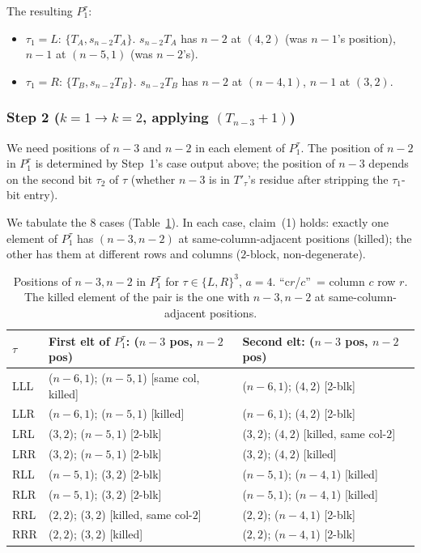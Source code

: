 \documentclass[11pt]{article}
\theoremstyle{definition}
\begin{document}
The resulting $P_1^\tau$:
\begin{itemize}[leftmargin=2em,topsep=0.3em,itemsep=0.2em]
\item $\tau_1=L$: $\{T_A,s_{n-2}T_A\}$.  $s_{n-2}T_A$ has $n-2$ at
$(4,2)$ (was $n-1$'s position), $n-1$ at $(n-5,1)$ (was $n-2$'s).
\item $\tau_1=R$: $\{T_B,s_{n-2}T_B\}$.  $s_{n-2}T_B$ has $n-2$ at
$(n-4,1)$, $n-1$ at $(3,2)$.
\end{itemize}

\subsubsection*{Step 2 ($k=1\to k=2$, applying $(T_{n-3}{+}1)$)}

We need positions of $n-3$ and $n-2$ in each element of $P_1^\tau$.
The position of $n-2$ in $P_1^\tau$ is determined by Step~1's case
output above; the position of $n-3$ depends on the second bit $\tau_2$
of $\tau$ (whether $n-3$ is in $T'_\tau$'s residue after stripping the
$\tau_1$-bit entry).

We tabulate the 8 cases (Table~\ref{tab:step2-positions}).  In each
case, claim~(1) holds: exactly one element of $P_1^\tau$ has
$(n-3,n-2)$ at same-column-adjacent positions (killed); the other has
them at different rows and columns ($2$-block, non-degenerate).

\begin{table}[h]
\caption{Positions of $n-3,n-2$ in $P_1^\tau$ for $\tau\in\{L,R\}^3$,
$a=4$.  ``c$r$/$c$''~= column $c$ row $r$.  The killed element of the
pair is the one with $n-3,n-2$ at same-column-adjacent positions.}
\label{tab:step2-positions}
\centering
\small
\begin{tabular}{lll}
\toprule
$\tau$ & First elt of $P_1^\tau$: ($n-3$ pos, $n-2$ pos) & Second elt: ($n-3$ pos, $n-2$ pos) \\
\midrule
LLL & ($n-6,1$); ($n-5,1$) [same col, killed]
    & ($n-6,1$); ($4,2$) [2-blk] \\
LLR & ($n-6,1$); ($n-5,1$) [killed]
    & ($n-6,1$); ($4,2$) [2-blk] \\
LRL & ($3,2$); ($n-5,1$) [2-blk]
    & ($3,2$); ($4,2$) [killed, same col-$2$] \\
LRR & ($3,2$); ($n-5,1$) [2-blk]
    & ($3,2$); ($4,2$) [killed] \\
RLL & ($n-5,1$); ($3,2$) [2-blk]
    & ($n-5,1$); ($n-4,1$) [killed] \\
RLR & ($n-5,1$); ($3,2$) [2-blk]
    & ($n-5,1$); ($n-4,1$) [killed] \\
RRL & ($2,2$); ($3,2$) [killed, same col-$2$]
    & ($2,2$); ($n-4,1$) [2-blk] \\
RRR & ($2,2$); ($3,2$) [killed]
    & ($2,2$); ($n-4,1$) [2-blk] \\
\bottomrule
\end{tabular}
\end{table}
\end{document}
